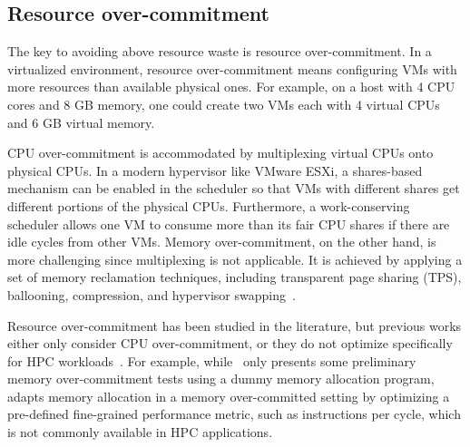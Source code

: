 \subsection{Resource over-commitment}
The key to avoiding above resource waste is resource over-commitment. In a 
virtualized environment, resource over-commitment means configuring VMs with more resources than available 
physical ones. For example, on a host with 4 CPU cores and 8 GB memory, one could create two VMs each 
with 4 virtual CPUs and 6 GB virtual memory. 

CPU over-commitment is accommodated by multiplexing virtual 
CPUs onto physical CPUs. In a modern hypervisor like VMware ESXi, a shares-based mechanism can be enabled  
in the scheduler so that VMs with different shares get different portions of the physical CPUs. 
Furthermore, a work-conserving scheduler 
allows one VM to consume more than its fair CPU shares if there are idle cycles from other VMs. 
Memory over-commitment, on the other hand, is more challenging since multiplexing is not 
applicable. It is achieved by applying a set of memory reclamation techniques, including transparent page sharing (TPS), 
ballooning, compression, and hypervisor swapping~\cite{Waldspurger:2002:MRM:844128.844146,banerjee2013memory}. 

Resource over-commitment has been studied in the literature, but previous works either only consider CPU over-commitment, or they do not optimize specifically for HPC workloads~\cite{Tesfatsion2018,shao2011analyzing,gordon2011ginkgo,li2012evaluating}. For example, while~\cite{li2012evaluating} only presents some preliminary memory over-commitment tests using a dummy memory allocation program, \cite{gordon2011ginkgo} adapts memory allocation in a memory over-committed setting by optimizing a 
pre-defined fine-grained performance metric, such as instructions per cycle, which is not commonly available in HPC applications.




